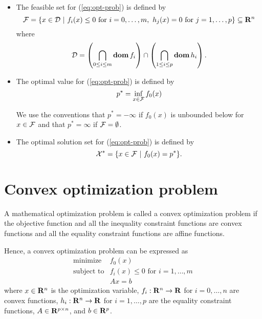 \begin{itemize}

\item
The feasible set for (\ref{eq:opt-prob}) is defined by
\begin{equation}
\mathcal{F}
=
\{x\in \mathcal{D}~|~ f_i(x)\leq 0 \mbox{ for } i =0, \ldots, m,\ h_j(x) = 0 \mbox{ for } j = 1,\ldots,p\}
\subseteq \mathbf{R}^n
\end{equation}
where
\begin{equation}
\mathcal{D} = \left( \bigcap_{0\leq i\leq m} \mathop{\bf dom} f_i \right) \cap \left( \bigcap_{1\leq i\leq p} \mathop{\bf dom} h_i \right).
\end{equation}

\item
The optimal value for (\ref{eq:opt-prob}) is defined by
\begin{equation}
p^\ast = \inf_{x\in\mathcal{F}} f_0(x)
\end{equation}

We use the conventions that $p^\ast = -\infty$ if $f_0(x)$ is unbounded below for $x\in \mathcal{F}$
and that $p^\ast = \infty$ if $\mathcal{F} = \emptyset$.

\item
The optimal solution set for (\ref{eq:opt-prob}) is defined by
\begin{equation}
\mathcal{X}^\ast = \{x\in\mathcal{F}~|~f_0(x) = p^\ast\}.
\end{equation}


\end{itemize}


\section{Convex optimization problem}

A mathematical optimization problem is called a convex optimization problem
if the objective function and all the inequality constraint functions are convex functions
and all the equality constraint functions are affine functions.

Hence, a convex optimization problem can be expressed as
\begin{equation}
\label{eq:cvx-opt-prob}
\begin{array}{ll}
\mbox{minimize} & f_0(x)
\\
\mbox{subject to} & f_i(x) \leq 0 \mbox{ for } i = 1, \ldots, m
\\
& A x = b
\end{array}
\end{equation}
where
$x\in\mathbf{R}^n$ is the optimization variable,
$f_i:\mathbf{R}^n\to\mathbf{R}$ for $i=0,\ldots,n$ are convex functions,
$h_i:\mathbf{R}^n\to\mathbf{R}$ for $i=1,\ldots,p$ are the equality constraint functions,
$A \in \mathbf{R}^{p\times n}$, and $b\in\mathbf{R}^p$.

